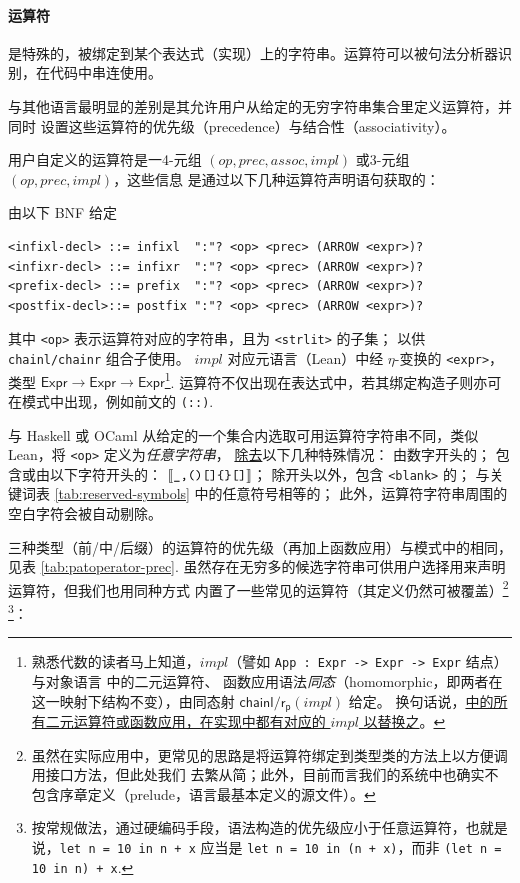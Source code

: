 \paragraph{运算符} 是特殊的，被绑定到某个表达式（实现）上的字符串。运算符可以被句法分析器识别，在代码中串连使用。

\Tigris 与其他语言最明显的差别是其允许用户从给定的无穷字符串集合里定义运算符，并同时
设置这些运算符的优先级（precedence）与结合性（associativity）。

用户自定义的运算符是一4-元组 \((op, prec, assoc, impl)\) 或3-元组 \((op, prec, impl)\)，这些信息
是通过以下几种运算符声明语句获取的：
\begin{definition}[运算符声明]由以下 BNF 给定
\begin{verbatim}
<infixl-decl> ::= infixl  ":"? <op> <prec> (ARROW <expr>)?
<infixr-decl> ::= infixr  ":"? <op> <prec> (ARROW <expr>)?
<prefix-decl> ::= prefix  ":"? <op> <prec> (ARROW <expr>)?
<postfix-decl>::= postfix ":"? <op> <prec> (ARROW <expr>)?
\end{verbatim}
  其中 \texttt{<op>} 表示运算符对应的字符串，且为 \texttt{<strlit>} 的子集；
  以供 \texttt{chainl/chainr} 组合子使用。
  $impl$ 对应元语言（Lean）中经 $\eta$-变换的 \texttt{<expr>}，类型 $\mathsf{Expr}\to\mathsf{Expr}\to\mathsf{Expr}$\footnote{
    熟悉代数的读者马上知道，$impl$（譬如 \texttt{App : Expr -> Expr -> Expr} 结点）与对象语言 \Tigris 中的二元运算符、
    函数应用语法\emph{同态}（homomorphic，即两者在这一映射下结构不变），由同态射 $\mathsf{chainl/r_p}(impl)$ 给定。
    换句话说，\underline{\Tigris 中的所有二元运算符或函数应用，在实现中都有对应的 $impl$ 以替换之}。
  }.
  运算符不仅出现在表达式中，若其绑定构造子则亦可在模式中出现，例如前文的 \texttt{(::)}.
\end{definition}
\begin{definition}
  与 Haskell 或 OCaml 从给定的一个集合内选取可用运算符字符串不同，类似 Lean，\Tigris 将 \texttt{<op>} 定义为\emph{任意字符串}，
  \underline{除去}以下几种特殊情况：
  由数字开头的；
  包含或由以下字符开头的： \(\llbracket \texttt{\_,()[]\{\}[]} \rrbracket\)；
  除开头以外，包含 \texttt{<blank>} 的；
  与关键词表 \ref{tab:reserved-symbols} 中的任意符号相等的；
  此外，运算符字符串周围的空白字符会被自动剔除。
\end{definition}
三种类型（前/中/后缀）的运算符的优先级（再加上函数应用）与模式中的相同，见表 \ref{tab:patoperator-prec}.
虽然存在无穷多的候选字符串可供用户选择用来声明运算符，但我们也用同种方式
内置了一些常见的运算符（其定义仍然可被覆盖）\footnote{
  虽然在实际应用中，更常见的思路是将运算符绑定到类型类的方法上以方便调用接口方法，但此处我们
  去繁从简；此外，目前而言我们的系统中也确实不包含序章定义（prelude，语言最基本定义的源文件）。
}\,\footnote{
  按常规做法，通过硬编码手段，语法构造的优先级应小于任意运算符，也就是说，\texttt{let n = 10 in n + x}
  应当是 \texttt{let n = 10 in (n + x)}，而非 \texttt{(let n = 10 in n) + x}.
}：
